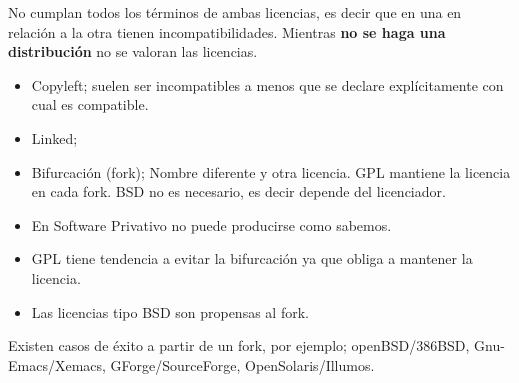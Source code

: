 \documentclass{scrartcl}
\begin{document}
No cumplan todos los términos de ambas licencias, es decir que en una en relación a la otra tienen incompatibilidades. Mientras \textbf{no se haga una distribución} no se valoran las licencias.

\begin{itemize}
    \item Copyleft; suelen ser incompatibles a menos que se declare explícitamente con cual es compatible.
    \item Linked; 
    \item Bifurcación (fork); Nombre diferente y otra licencia. GPL mantiene la licencia en cada fork. BSD no es necesario, es decir depende del licenciador.
    \item En Software Privativo no puede producirse como sabemos.
    \item GPL tiene tendencia a evitar la bifurcación ya que obliga a mantener la licencia.
    \item Las licencias tipo BSD son propensas al fork.
\end{itemize}

Existen casos de éxito a partir de un fork, por ejemplo; openBSD/386BSD, Gnu-Emacs/Xemacs, GForge/SourceForge, OpenSolaris/Illumos.
\end{document}
